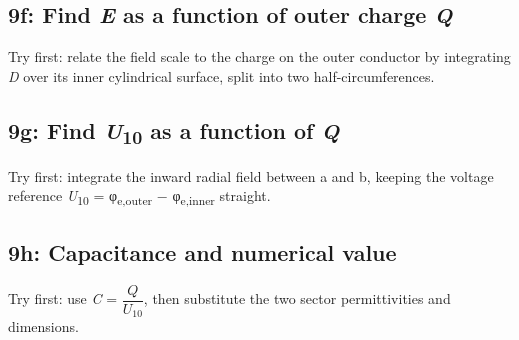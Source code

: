 \documentclass[11pt]{article}
\begin{document}
\begin{keepsection}
\begin{keepsection}
\subsection{9f: Find \textit{E} as a function of outer charge \textit{Q}}

Try first: relate the field scale to the charge on the outer conductor by integrating \textit{D} over its inner cylindrical surface, split into two half-circumferences.

\end{keepsection}

\begin{keepsection}
\subsection{9g: Find \textit{U}\textsubscript{10} as a function of \textit{Q}}

Try first: integrate the inward radial field between a and b, keeping the voltage reference \textit{U}\textsubscript{10} = φ\textsubscript{e,outer} \ensuremath{-} φ\textsubscript{e,inner} straight.

\end{keepsection}

\begin{keepsection}
\subsection{9h: Capacitance and numerical value}

Try first: use \textit{C} = {\small\ensuremath{\dfrac{{Q}}{{U}_{10}}}}, then substitute the two sector permittivities and dimensions.

\end{keepsection}
\end{keepsection}


\clearpage
\end{document}
